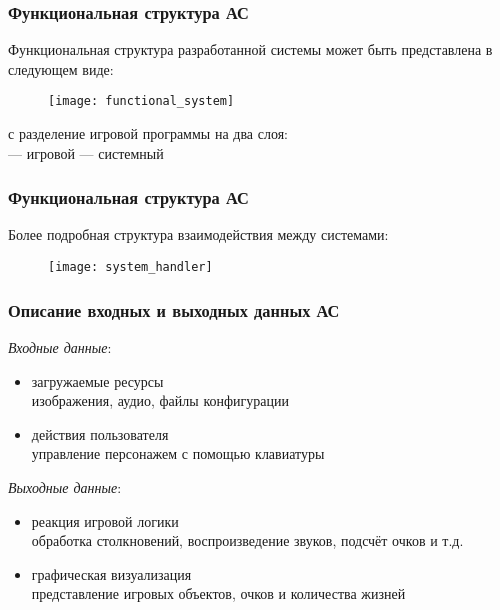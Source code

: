 \begin{frame}
    \frametitle{Функциональная структура АС}
    Функциональная структура разработанной системы может быть представлена в следующем виде:
    \begin{figure}
        \centering
        \texttt{[image: functional\_system]}
    \end{figure}
    с разделение игровой программы на два слоя:\\
    --- игровой \qquad --- системный\\
\end{frame}

\begin{frame}
    \frametitle{Функциональная структура АС}
    Более подробная структура взаимодействия между системами:
    \begin{figure}
        \centering
        \texttt{[image: system\_handler]}
    \end{figure}
\end{frame}

\begin{frame}
    \frametitle{Описание входных и выходных данных АС}

    \emph{Входные данные}:
    \begin{itemize}
        \item загружаемые ресурсы\\
        \scriptsize изображения, аудио, файлы конфигурации
        \item \normalsize действия пользователя\\
        \scriptsize управление персонажем с помощью клавиатуры
    \end{itemize}
    \emph{Выходные данные}:
    \begin{itemize}
        \item реакция игровой логики\\
        \scriptsize обработка столкновений, воспроизведение звуков, подсчёт очков и т.д.
        \item \normalsize графическая визуализация\\
        \scriptsize представление игровых объектов, очков и количества жизней
    \end{itemize}
\end{frame}

